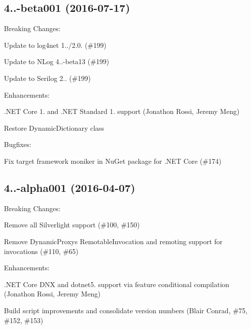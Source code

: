 \subsection*{4..-\/beta001 (2016-\/07-\/17)}

Breaking Changes\+:
\begin{DoxyItemize}
\item Update to log4net 1../2.0. (\#199)
\item Update to N\+Log 4..-\/beta13 (\#199)
\item Update to Serilog 2.. (\#199)
\end{DoxyItemize}

Enhancements\+:
\begin{DoxyItemize}
\item .N\+ET Core 1. and .N\+ET Standard 1. support (Jonathon Rossi, Jeremy Meng)
\item Restore Dynamic\+Dictionary class
\end{DoxyItemize}

Bugfixes\+:
\begin{DoxyItemize}
\item Fix target framework moniker in Nu\+Get package for .N\+ET Core (\#174)
\end{DoxyItemize}

\subsection*{4..-\/alpha001 (2016-\/04-\/07)}

Breaking Changes\+:
\begin{DoxyItemize}
\item Remove all Silverlight support (\#100, \#150)
\item Remove Dynamic\+Proxy\textquotesingle{}s Remotable\+Invocation and remoting support for invocations (\#110, \#65)
\end{DoxyItemize}

Enhancements\+:
\begin{DoxyItemize}
\item .N\+ET Core D\+NX and dotnet5. support via feature conditional compilation (Jonathon Rossi, Jeremy Meng)
\item Build script improvements and consolidate version numbers (Blair Conrad, \#75, \#152, \#153)
\end{DoxyItemize}

